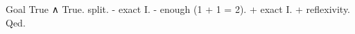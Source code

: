 \begin{coq_example}
Goal True ∧ True.
  split.
  - exact I.
  - enough (1 + 1 = 2).
    + exact I.
    + reflexivity.
Qed.
\end{coq_example}

